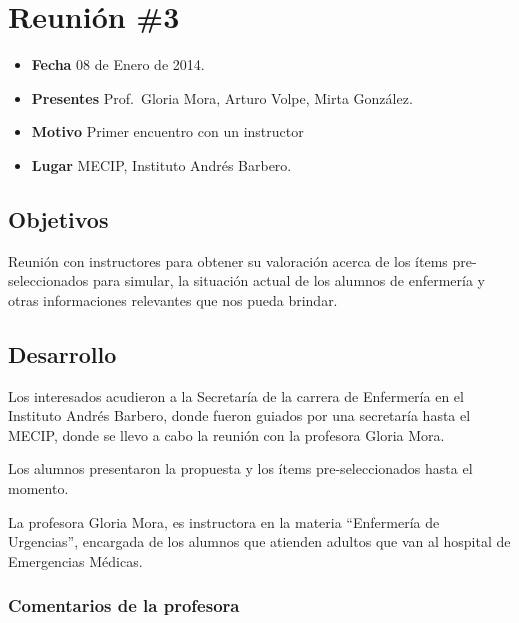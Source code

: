 \section{Reunión \#3}

\begin{itemize}
\itemsep1pt\parskip0pt
\item
  \textbf{Fecha} 08 de Enero de 2014.
\item
  \textbf{Presentes} Prof.~Gloria Mora, Arturo Volpe, Mirta González.
\item
  \textbf{Motivo} Primer encuentro con un instructor
\item
  \textbf{Lugar} MECIP, Instituto Andrés Barbero.
\end{itemize}

\subsection{Objetivos}

Reunión con instructores para obtener su valoración acerca de los ítems
pre-seleccionados para simular, la situación actual de los alumnos de
enfermería y otras informaciones relevantes que nos pueda brindar.

\subsection{Desarrollo}

Los interesados acudieron a la Secretaría de la carrera de Enfermería en
el Instituto Andrés Barbero, donde fueron guiados por una secretaría
hasta el MECIP, donde se llevo a cabo la reunión con la profesora Gloria
Mora.

Los alumnos presentaron la propuesta y los ítems pre-seleccionados hasta
el momento.

La profesora Gloria Mora, es instructora en la materia ``Enfermería de
Urgencias'', encargada de los alumnos que atienden adultos que van al
hospital de Emergencias Médicas.

\subsubsection{Comentarios de la
profesora}

